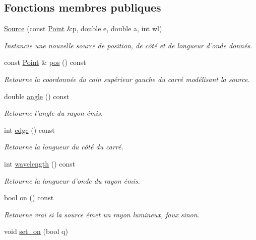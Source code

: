 \subsection*{Fonctions membres publiques}
\begin{DoxyCompactItemize}
\item 
\hyperlink{classSource_a25946b40bbfdcd0edb76b76f1ed6ba1c}{Source} (const \hyperlink{classPoint}{Point} \&p, double e, double a, int wl)
\begin{DoxyCompactList}\small\item\em Instancie une nouvelle source de position, de côté et de longueur d'onde donnés. \end{DoxyCompactList}\item 
const \hyperlink{classPoint}{Point} \& \hyperlink{classSource_a76bacb281440bb9e6454a2aea0130aa1}{pos} () const 
\begin{DoxyCompactList}\small\item\em Retourne la coordonnée du coin supérieur gauche du carré modélisant la source. \end{DoxyCompactList}\item 
double \hyperlink{classSource_ab31305003e1300e56d0175e72daac9fa}{angle} () const 
\begin{DoxyCompactList}\small\item\em Retourne l'angle du rayon émis. \end{DoxyCompactList}\item 
int \hyperlink{classSource_a1b9bee6ad0a5d80e99ec9dd4d6ef1cae}{edge} () const 
\begin{DoxyCompactList}\small\item\em Retourne la longueur du côté du carré. \end{DoxyCompactList}\item 
int \hyperlink{classSource_a6f8e7736f57e83a6abc682d166e1dc9c}{wavelength} () const 
\begin{DoxyCompactList}\small\item\em Retourne la longueur d'onde du rayon émis. \end{DoxyCompactList}\item 
bool \hyperlink{classSource_a99bdb664ff91a622ca25306d394baed8}{on} () const 
\begin{DoxyCompactList}\small\item\em Retourne vrai si la source émet un rayon lumineux, faux sinon. \end{DoxyCompactList}\item 
void \hyperlink{classSource_a32feea9470d5175de1509a228eb10f56}{set\+\_\+on} (bool q)

\end{DoxyCompactItemize}
